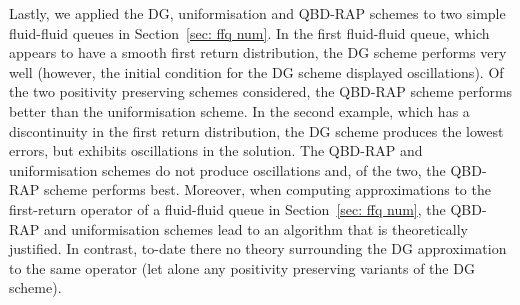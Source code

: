 Lastly, we applied the DG, uniformisation and QBD-RAP schemes to two simple fluid-fluid queues in Section~\ref{sec: ffq num}. In the first fluid-fluid queue, which appears to have a smooth first return distribution, the DG scheme performs very well (however, the initial condition for the DG scheme displayed oscillations). Of the two positivity preserving schemes considered, the QBD-RAP scheme performs better than the uniformisation scheme. In the second example, which has a discontinuity in the first return distribution, the DG scheme produces the lowest errors, but exhibits oscillations in the solution. The QBD-RAP and uniformisation schemes do not produce oscillations and, of the two, the QBD-RAP scheme performs best. Moreover, when computing approximations to the first-return operator of a fluid-fluid queue in Section~\ref{sec: ffq num}, the QBD-RAP and uniformisation schemes lead to an algorithm that is theoretically justified. In contrast, to-date there no theory surrounding the DG approximation to the same operator (let alone any positivity preserving variants of the DG scheme).




